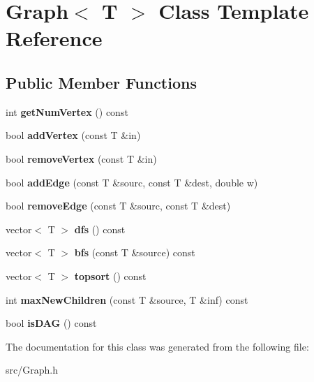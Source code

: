 \hypertarget{class_graph}{}\section{Graph$<$ T $>$ Class Template Reference}
\label{class_graph}
\subsection*{Public Member Functions}
\begin{DoxyCompactItemize}
\item 
\mbox{\label{class_graph_a0853eac15cdf0f06d63f4b8a7820ec71}} 
int {\bfseries get\+Num\+Vertex} () const
\item 
\mbox{\label{class_graph_a00be284ea2be3b3d0f0d2e493b70245b}} 
bool {\bfseries add\+Vertex} (const T \&in)
\item 
\mbox{\label{class_graph_af9c903104ad69a7782979fa9caedf163}} 
bool {\bfseries remove\+Vertex} (const T \&in)
\item 
\mbox{\label{class_graph_ac61af3aafe6277215f5a3b3cc7d58ce2}} 
bool {\bfseries add\+Edge} (const T \&sourc, const T \&dest, double w)
\item 
\mbox{\label{class_graph_a1106092a37366486cf55576f9ec01692}} 
bool {\bfseries remove\+Edge} (const T \&sourc, const T \&dest)
\item 
\mbox{\label{class_graph_a911798b1a89f8c4ae90ba3eee849cff8}} 
vector$<$ T $>$ {\bfseries dfs} () const
\item 
\mbox{\label{class_graph_aa47a4130165550e208e7a063fce6983a}} 
vector$<$ T $>$ {\bfseries bfs} (const T \&source) const
\item 
\mbox{\label{class_graph_af1d4affd1f886bf598d0f4cf4a0cb7cb}} 
vector$<$ T $>$ {\bfseries topsort} () const
\item 
\mbox{\label{class_graph_a3dbf946fc46257f2d799077ffba5980f}} 
int {\bfseries max\+New\+Children} (const T \&source, T \&inf) const
\item 
\mbox{\label{class_graph_a1ea1512afe5ab878301bc806c2eba9d2}} 
bool {\bfseries is\+D\+AG} () const
\end{DoxyCompactItemize}


The documentation for this class was generated from the following file\+:\begin{DoxyCompactItemize}
\item 
src/Graph.\+h\end{DoxyCompactItemize}
